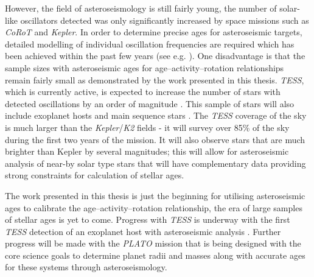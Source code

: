 However, the field of asteroseismology is still fairly young, the number of solar-like oscillators detected was only significantly increased by space missions such as \textit{CoRoT} and \textit{Kepler}. In order to determine precise ages for asteroseismic targets, detailed modelling of individual oscillation frequencies are required which has been achieved within the past few years (see e.g. \citealt{Silva_Aguirre_etal_2017}). One disadvantage is that the sample sizes with asteroseismic ages for age--activity--rotation relationships remain fairly small as demonstrated by the work presented in this thesis. \textit{TESS}, which is currently active, is expected to increase the number of stars with detected oscillations by an order of magnitude \citep{Schofield_etal_2019}. This sample of stars will also include exoplanet hosts and main sequence stars \citep{Campante_etal_2016}. The \textit{TESS} coverage of the sky is much larger than the \textit{Kepler}/\textit{K2} fields - it will survey over 85\% of the sky during the first two years of the mission. It will also observe stars that are much brighter than Kepler by several magnitudes; this will allow for asteroseismic analysis of near-by solar type stars that will have complementary data providing strong constraints for calculation of stellar ages.

The work presented in this thesis is just the beginning for utilising asteroseismic ages to calibrate the age--activity--rotation relationship, the era of large samples of stellar ages is yet to come. Progress with \textit{TESS} is underway with the first \textit{TESS} detection of an exoplanet host with asteroseismic analysis \citep{Huber_etal_2019}. Further progress will be made with the \textit{PLATO} mission \citep{Rauer_etal_2014} that is being designed with the core science goals to determine planet radii and masses along with accurate ages for these systems through asteroseismology.